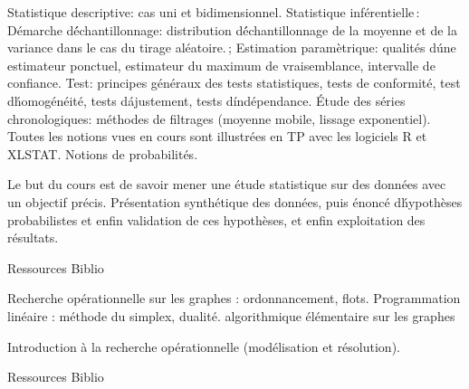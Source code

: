 {
Statistique descriptive: cas uni et bidimensionnel. Statistique inférentielle\,: Démarche d\'échantillonnage: distribution d\'échantillonnage de la moyenne et de la variance dans le cas du tirage aléatoire.\,; Estimation paramètrique: qualités d\'une estimateur ponctuel, estimateur du maximum de vraisemblance, intervalle de confiance. Test: principes généraux des tests statistiques, tests de conformité, test d\'homogénéité, tests d\'ajustement, tests d\'indépendance. Étude des séries chronologiques: méthodes de filtrages (moyenne mobile, lissage exponentiel). Toutes les notions vues en cours sont illustrées en TP avec les logiciels R et XLSTAT. 
} 
{Notions de probabilités.} 
{\begin{itemize} 
 \ObjItem Le but du cours est de savoir mener une étude statistique sur des données avec un objectif précis. 
 \ObjItem Présentation synthétique des données, puis énoncé d\'hypothèses probabilistes et enfin validation de ces hypothèses, et enfin exploitation des résultats. 
\end{itemize} 
} 
{Ressources} 
{Biblio} 
 
\vfill

{
Recherche opérationnelle sur les graphes : ordonnancement, flots. Programmation linéaire : méthode du simplex, dualité. 
} 
{algorithmique élémentaire sur les graphes} 
{\begin{itemize}
 \ObjItem Introduction à la recherche opérationnelle (modélisation et résolution).
\end{itemize} 
} 
{Ressources} 
{Biblio} 
 
